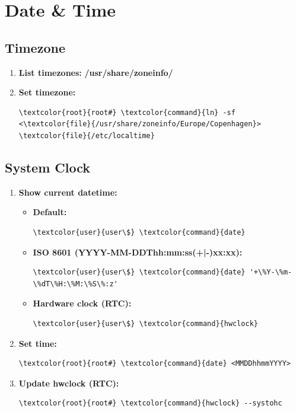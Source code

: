 \documentclass[10pt, a4paper, onecolumn, oneside, titlepage, openany]{book}
\begin{document}
\section{Date \& Time}
\label{datetime}
\subsection{Timezone}
\begin{enumerate}
    \item \textbf{List timezones:}
\newline \textbf{\textcolor{dir}{/usr/share/zoneinfo/}}
    \item \textbf{Set timezone:}
\begin{Verbatim}[commandchars=\\\{\}]
\textcolor{root}{root#} \textcolor{command}{ln} -sf <\textcolor{file}{/usr/share/zoneinfo/Europe/Copenhagen}> \textcolor{file}{/etc/localtime}
\end{Verbatim}   
\end{enumerate}
\subsection{System Clock}
\begin{enumerate}
    \item \textbf{Show current datetime:}
    \begin{itemize}
        \item \textbf{Default:}
\begin{Verbatim}[commandchars=\\\{\}]
\textcolor{user}{user\$} \textcolor{command}{date}
\end{Verbatim}   
        \item \textbf{ISO 8601 (YYYY-MM-DDThh:mm:ss(+|-)xx:xx):}
\begin{Verbatim}[commandchars=\\\{\}]
\textcolor{user}{user\$} \textcolor{command}{date} '+\%Y-\%m-\%dT\%H:\%M:\%S\%:z'
\end{Verbatim}
        \item \textbf{Hardware clock (RTC):}
\begin{Verbatim}[commandchars=\\\{\}]
\textcolor{user}{user\$} \textcolor{command}{hwclock}
\end{Verbatim}
    \end{itemize}
    \item \textbf{Set time:}
\begin{Verbatim}[commandchars=\\\{\}]
\textcolor{root}{root#} \textcolor{command}{date} <MMDDhhmmYYYY>
\end{Verbatim}
    \item \textbf{Update hwclock (RTC):}
\begin{Verbatim}[commandchars=\\\{\}]
\textcolor{root}{root#} \textcolor{command}{hwclock} --systohc
\end{Verbatim}
\end{enumerate}
\end{document}
